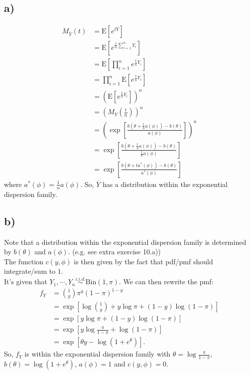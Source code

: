 \documentclass[a4paper]{article}
\newcommand{\E}{\mathrm{E}}
\begin{document}
\subsection{a)}
\begin{align*}
M_{\overline{Y}}(t) &= \E\left[e^{t \overline{Y}}\right]\\
&= \E\left[e^{\frac{t}{n} \sum_{i=1}^{n}Y_{i}}\right]\\
&= \E\left[\prod_{i=1}^{n} e^{\frac{t}{n} Y_{i}}\right]\\
&= \prod_{i=1}^{n}\E\left[e^{\frac{t}{n} Y_{i}}\right]\\
&= \left(\E\left[e^{\frac{t}{n} Y_{i}}\right]\right)^{n}\\
&= \left(M_{Y}\left(\frac{t}{n}\right)\right)^{n}\\
&= \left(\exp\left[\frac{b(\theta + \frac{t}{n} a(\phi)) -b(\theta)}{a(\phi)}\right]\right)^{n}\\
&= \exp\left[\frac{b(\theta + \frac{t}{n} a(\phi)) -b(\theta)}{\frac{1}{n}a(\phi)}\right]\\
&= \exp\left[\frac{b(\theta + t a^{*}(\phi)) -b(\theta)}{a^{*}(\phi)}\right]
\end{align*}
where $a^{*}(\phi) = \frac{1}{n}a(\phi)$.
So, $\overline{Y}$ has a distribution within the exponential dispersion family.


\subsection{b)}
Note that a distribution within the exponential dispersion family is determined by $b(\theta)$ and $a(\phi)$. (e.g. see extra exercise 10.a))\\
The function $c(y,\phi)$ is then given by the fact that pdf/pmf should integrate/sum to $1$.\\

It's given that $Y_{1}, \cdots, Y_{n} \stackrel{i.i.d.}{\sim} \mathrm{Bin}(1,\pi)$. We can then rewrite the pmf:
\begin{align*}
f_{Y} &= \binom{1}{y}\pi^{y}(1-\pi)^{1-y}\\
&= \exp\left[\log\binom{1}{y} + y\log \pi +(1-y)\log(1-\pi) \right]\\
&= \exp\left[y\log \pi +(1-y)\log(1-\pi) \right]\\
&= \exp\left[y\log\frac{\pi}{1-\pi} +\log(1-\pi)\right]\\
&= \exp\left[\theta y -\log(1+e^{\theta})\right].
\end{align*}
So, $f_{Y}$ is within the exponential dispersion family with $\theta = \log\frac{\pi}{1-\pi}$, $b(\theta) = \log(1+e^{\theta})$, $a(\phi) = 1$ and $c(y,\phi) = 0$.\\
\end{document}
